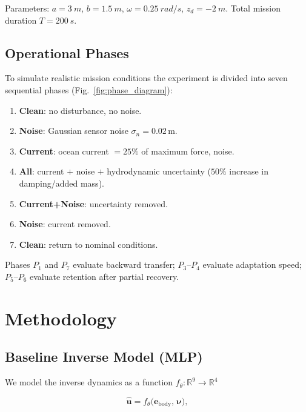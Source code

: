\documentclass[journal]{IEEEtran}
\newcommand{\R}{\mathbb{R}}
\newcommand{\bu}{\bm{u}}
\newcommand{\bnu}{\bm{\nu}}
\begin{document}
Parameters: $a = \SI{3}{m}$, $b = \SI{1.5}{m}$, $\omega = \SI{0.25}{rad/s}$,
$z_d = \SI{-2}{m}$. Total mission duration $T = \SI{200}{s}$.

\subsection{Operational Phases}

To simulate realistic mission conditions the experiment is divided into
seven sequential phases (Fig.~\ref{fig:phase_diagram}):

\begin{enumerate}
  \item[$P_1$] \textbf{Clean}: no disturbance, no noise.
  \item[$P_2$] \textbf{Noise}: Gaussian sensor noise $\sigma_n = 0.02$\,m.
  \item[$P_3$] \textbf{Current}: ocean current $= 25\%$ of maximum force, noise.
  \item[$P_4$] \textbf{All}: current $+$ noise $+$ hydrodynamic uncertainty
               ($50\%$ increase in damping/added mass).
  \item[$P_5$] \textbf{Current+Noise}: uncertainty removed.
  \item[$P_6$] \textbf{Noise}: current removed.
  \item[$P_7$] \textbf{Clean}: return to nominal conditions.
\end{enumerate}

Phases $P_1$ and $P_7$ evaluate backward transfer; $P_3$–$P_4$ evaluate
adaptation speed; $P_5$–$P_6$ evaluate retention after partial recovery.

\section{Methodology}
\label{sec:method}

\subsection{Baseline Inverse Model (MLP)}

We model the inverse dynamics as a function
$f_\theta: \R^9 \to \R^4$

\begin{equation}
  \hat{\bu} = f_\theta\!\bigl(\bm{e}_\text{body},\, \bnu\bigr),
  \label{eq:inverse}
\end{equation}
\end{document}
